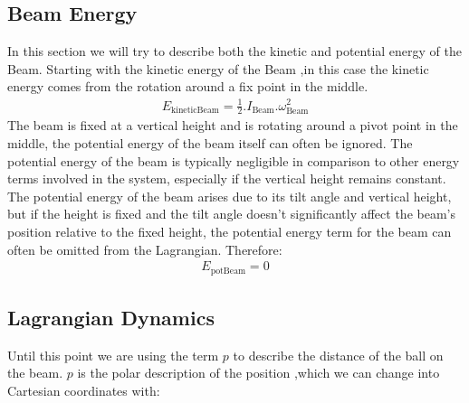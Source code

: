 \documentclass{article}
\begin{document}
\subsection{Beam Energy}
\noindent In this section we will try to describe both the kinetic and potential energy of the Beam.
Starting with the kinetic energy of the Beam ,in this case the kinetic energy comes from the rotation around a fix point in the
middle.
\begin{equation}\label{kineticBeam}
	\begin{split}
		E_{\text{kineticBeam}} = \frac{1}{2}.I_{\text{Beam}}.\omega_{\text{Beam}}^2
	\end{split}	
\end{equation}
\noindent The beam is fixed at a vertical height and is rotating around a pivot point 
in the middle, the potential energy of the beam itself can often be ignored.
The potential energy of the beam is typically negligible in comparison to other energy terms
involved in the system,
especially if the vertical height remains constant.
The potential energy of the beam arises due to its tilt angle and vertical height, 
but if the height is fixed and the tilt angle doesn't significantly affect 
the beam's position relative to the fixed height, 
the potential energy term for the beam can often be omitted from the Lagrangian.
Therefore:
\begin{equation}
	\begin{split}
		E_{\text{potBeam}} = 0
	\end{split}
\end{equation}

\subsection{Lagrangian Dynamics}
Until this point we are using the term $p$ to describe the distance of the ball on the beam.
$p$ is the polar description of the position ,which we can change into Cartesian coordinates with:
\end{document}

